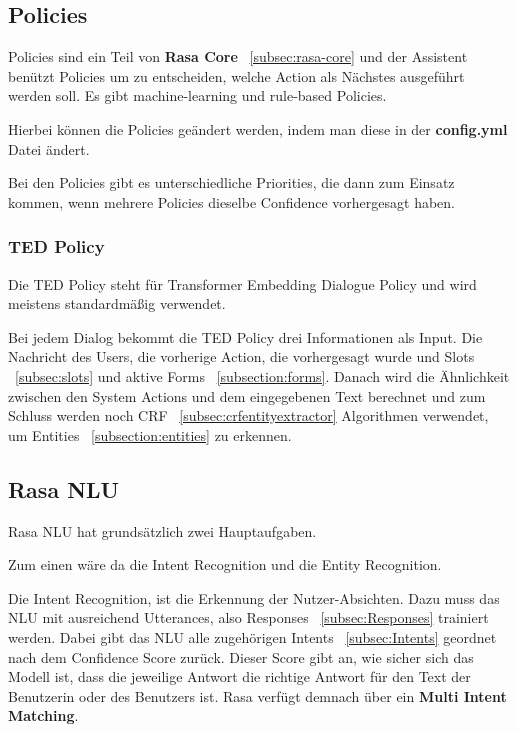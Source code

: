 \subsection{Policies}\label{subsec:policies}

Policies sind ein Teil von \textbf{Rasa Core} ~\ref{subsec:rasa-core} und der Assistent benützt Policies um zu entscheiden, welche Action als Nächstes ausgeführt werden soll.
Es gibt machine-learning und rule-based Policies.\cite{policies}

Hierbei können die Policies geändert werden, indem man diese in der \textbf{config.yml} Datei ändert.

Bei den Policies gibt es unterschiedliche Priorities, die dann zum Einsatz kommen, wenn mehrere Policies dieselbe Confidence vorhergesagt haben.\cite{policyPriority}

\subsubsection{TED Policy}

Die TED Policy steht für Transformer Embedding Dialogue Policy und wird meistens standardmäßig verwendet.\cite{tedPolicy}

Bei jedem Dialog bekommt die TED Policy drei Informationen als Input.
Die Nachricht des Users, die vorherige Action, die vorhergesagt wurde und Slots ~\ref{subsec:slots} und aktive Forms ~\ref{subsection:forms}.
Danach wird die Ähnlichkeit zwischen den System Actions und dem eingegebenen Text berechnet und zum Schluss werden noch CRF ~\ref{subsec:crfentityextractor} Algorithmen verwendet, um Entities ~\ref{subsection:entities} zu erkennen.\cite{tedPolicy}

\subsection{Rasa NLU}\label{subsec:rasa-nlu}

Rasa NLU hat grundsätzlich zwei Hauptaufgaben.

Zum einen wäre da die Intent Recognition und die Entity Recognition.\cite{rasanlu, pretrainedVsSupervised}

Die Intent Recognition, ist die Erkennung der Nutzer-Absichten.
Dazu muss das NLU mit ausreichend Utterances, also Responses ~\ref{subsec:Responses} trainiert werden.
Dabei gibt das NLU alle zugehörigen Intents ~\ref{subsec:Intents} geordnet nach dem Confidence Score zurück.
Dieser Score gibt an, wie sicher sich das Modell ist, dass die jeweilige Antwort die richtige Antwort für den Text der Benutzerin oder des Benutzers ist.
Rasa verfügt demnach über ein \textbf{Multi Intent Matching}.\cite{rasanlu, pretrainedVsSupervised}

